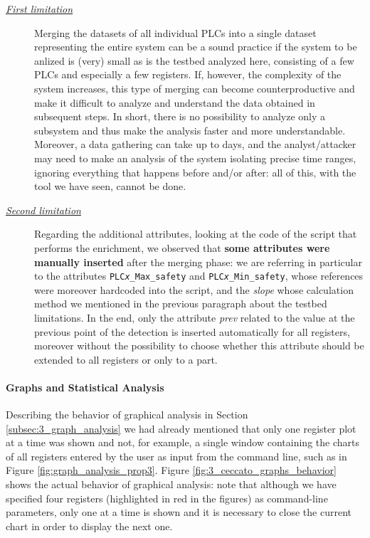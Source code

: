 \begin{description}
	\item[\emph{\underline{First limitation}}] Merging the datasets of all individual PLCs into a single dataset representing the entire system can be a sound practice if the system to be anlized is (very) small as is the testbed analyzed here, consisting of a few PLCs and especially a few registers. If, however, the complexity of the system increases, this type of merging can become counterproductive and make it difficult to analyze and understand the data obtained in subsequent steps.\newline
	In short, there is no possibility to analyze only a subsystem and thus make the analysis faster and more understandable. Moreover, a data gathering can take up to days, and the analyst/attacker may need to make an analysis of the system isolating precise time ranges, ignoring everything that happens before and/or after: all of this, with the tool we have seen, cannot be done.

	\item[\emph{\underline{Second limitation}}] Regarding the additional attributes, looking at the code of the script that performs the enrichment, we observed that \textbf{some attributes were manually inserted} after the merging phase: we are referring in particular to the attributes \texttt{PLC\textit{x}\_Max\_safety} and \texttt{PLC\textit{x}\_Min\_safety}, whose references were moreover hardcoded into the script, and the \textit{slope} whose calculation method we mentioned in the previous paragraph about the testbed limitations.\newline
	In the end, only the attribute \textit{prev} related to the value at the previous point of the detection is inserted automatically for all registers, moreover without the possibility to choose whether this attribute should be extended to all registers or only to a part.
\end{description}

\paragraph{Graphs and Statistical Analysis}
\label{par:3_graphs_limitations}
Describing the behavior of graphical analysis in Section \ref{subsec:3_graph_analysis} we had already mentioned that only one register plot at a time was shown and not, for example, a single window containing the charts of all registers entered by the user as input from the command line, such as in Figure \ref{fig:graph_analysis_prop3}. Figure \ref{fig:3_ceccato_graphs_behavior} shows the actual behavior of graphical analysis: note that although we have specified four registers (highlighted in red in the figures) as command-line parameters, only one at a time is shown and it is necessary to close the current chart in order to display the next one.

